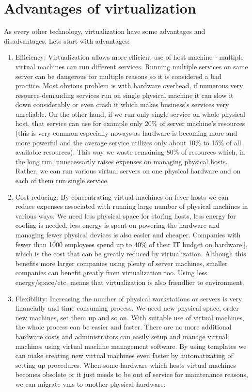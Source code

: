 \section{Advantages of virtualization}
As every other technology, virtualization have some advantages and disadvantages. Lets start with advantages:
\begin{enumerate}
\item Efficiency: Virtualization allows more efficient use of host machine - multiple virtual machines can run different services. Running multiple services on same server can be dangerous for multiple reasons so it is considered a bad practice. Most obvious problem is with hardware overhead, if numerous very resource-demanding services run on single physical machine it can slow it down considerably or even crash it which makes business's services very unreliable. On the other hand, if we run only single service on whole physical host, that service can use for example only 20\% of server machine's resources (this is very common especially noways as hardware is becoming more and more powerful and the average service utilizes only about 10\% to 15\% of all available resources). This way we waste remaining 80\% of resources which, in the long run, unnecessarily raises expenses on managing physical hosts. Rather, we can run various virtual servers on one physical hardware and on each of them run single service.
\item Cost reducing: By concentrating virtual machines on fever hosts we can reduce expenses associated with running large number of physical machines in various ways. We need less physical space for storing hosts, less energy for cooling is needed, less energy is spent on powering the hardware and managing fewer physical devices is also easier and cheaper. Companies with fewer than 1000 employees spend up to 40\% of their IT budget on hardware[], which is the cost that can be greatly reduced by virtualization. Although this benefits more larger companies using plenty of server machines, smaller companies can benefit greatly from virtualization too. Using less energy/space/etc. means that virtualization is also friendlier to environment.
\item Flexibility: Increasing the number of physical workstations or servers is very financially and time consuming process. We need new physical space, order new machines, set them up and so on. With suitable use of virtual machines, the whole process can be easier and faster. There are no more additional hardware costs and administrators can easily setup and manage virtual machines using virtual machine management software. By using templates we can make creating new virtual machines even faster by automatizating of setting up procedures. When some hardware which hosts virtual machines becomes obsolete or it just needs to be out of service for maintenance reasons, we can migrate vms to another physical hardware.

\end{enumerate}
